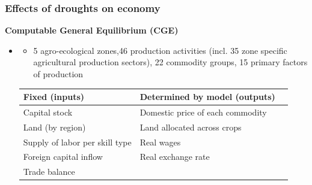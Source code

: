 \documentclass{beamer}              %
\begin{document}
\begin{frame}

\frametitle{Effects of droughts on economy}\label{Effects} 
\begin{block}{\textbf{Computable General Equilibrium (CGE)}}

\begin{itemize}

\item \underline{\textbf{\cite{robinson2010}}}
\begin{itemize}
\item 5 agro-ecological zones,46 production activities (incl. 35 zone specific agricultural production sectors), 22 commodity groups,  15 primary factors of production
\end{itemize}


\begin{table}
\begin{footnotesize}
\begin{tabular}{lll} 


\hline
\rowcolor{PaleGreen} \textbf{Fixed (inputs)} & \textbf{Determined by model (outputs)}  \\
 \hline
Capital stock& Domestic price of each commodity \\
Land (by region) & Land allocated across crops \\
Supply of labor per skill type& Real wages\\
Foreign capital inflow	& Real exchange rate\\
Trade balance	& \\
 \hline
\end{tabular}
\end{footnotesize}
\end{table}

\end{itemize}
\end{block}
\end{frame}
\end{document}
